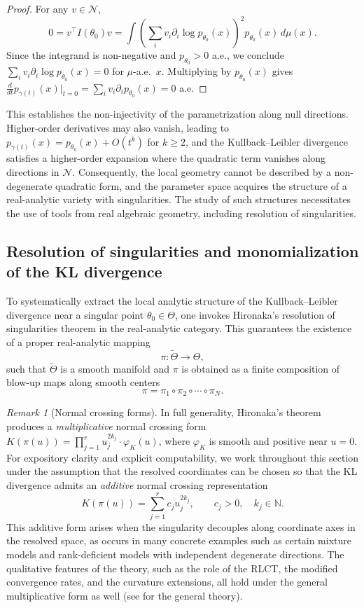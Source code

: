 \documentclass[11pt,letterpaper]{amsart}
\numberwithin{equation}{section}
\theoremstyle{plain}
\theoremstyle{definition}
\theoremstyle{remark}
\newtheorem{remark}[theorem]{Remark}
\begin{document}
\begin{proof}
For any $v \in \mathcal{N}$,
\[
0 = v^\top I(\theta_0) v
= \int \left( \sum_i v_i \partial_i \log p_{\theta_0}(x) \right)^2 p_{\theta_0}(x) \, d\mu(x).
\]
Since the integrand is non-negative and $p_{\theta_0}>0$ a.e., we conclude $\sum_i v_i \partial_i \log p_{\theta_0}(x) = 0$ for $\mu$-a.e.\ $x$. Multiplying by $p_{\theta_0}(x)$ gives $\frac{d}{dt}p_{\gamma(t)}(x)|_{t=0} = \sum_i v_i \partial_i p_{\theta_0}(x) = 0$ a.e.
\end{proof}

This establishes the non-injectivity of the parametrization along null directions. Higher-order derivatives may also vanish, leading to
$p_{\gamma(t)}(x) = p_{\theta_0}(x) + O(t^k)$ for $k \geq 2$, and the Kullback--Leibler divergence satisfies a higher-order expansion where the quadratic term vanishes along directions in $\mathcal{N}$.
Consequently, the local geometry cannot be described by a non-degenerate quadratic form, and the parameter space acquires the structure of a real-analytic variety with singularities. The study of such structures necessitates the use of tools from real algebraic geometry, including resolution of singularities.


\subsection{Resolution of singularities and monomialization of the KL divergence}

To systematically extract the local analytic structure of the Kullback--Leibler divergence near a singular point $\theta_0 \in \Theta$, one invokes Hironaka's resolution of singularities theorem in the real-analytic category. This guarantees the existence of a proper real-analytic mapping
\[
\pi : \widetilde{\Theta} \to \Theta,
\]
such that $\widetilde{\Theta}$ is a smooth manifold and $\pi$ is obtained as a finite composition of blow-up maps along smooth centers
\[
\pi = \pi_1 \circ \pi_2 \circ \cdots \circ \pi_N.
\]

\begin{remark}[Normal crossing forms]
\label{rem:normal_crossing}
In full generality, Hironaka's theorem produces a \emph{multiplicative} normal crossing form $K(\pi(u)) = \prod_{j=1}^r u_j^{2k_j} \cdot \varphi_K(u)$, where $\varphi_K$ is smooth and positive near $u=0$. For expository clarity and explicit computability, we work throughout this section under the assumption that the resolved coordinates can be chosen so that the KL divergence admits an \emph{additive} normal crossing representation
\[
K(\pi(u)) = \sum_{j=1}^r c_j u_j^{2k_j}, \qquad c_j > 0, \quad k_j \in \mathbb{N}.
\]
This additive form arises when the singularity decouples along coordinate axes in the resolved space, as occurs in many concrete examples such as certain mixture models and rank-deficient models with independent degenerate directions. The qualitative features of the theory, such as the role of the RLCT, the modified convergence rates, and the curvature extensions, all hold under the general multiplicative form as well (see \cite{Watanabe2009} for the general theory).
\end{remark}
\end{document}
